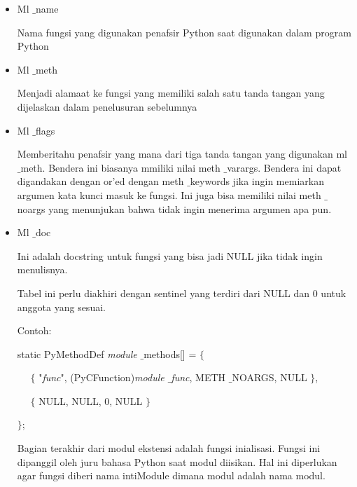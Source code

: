 \begin{itemize}
\item Ml $  \_  $name \par
Nama fungsi yang digunakan penafsir Python saat digunakan dalam program Python \par
\noindent 
\item Ml $  \_  $meth \par
Menjadi alamaat ke fungsi yang memiliki salah satu tanda tangan yang dijelaskan dalam penelusuran sebelumnya \par
\noindent 
\item Ml $  \_  $flags \par
Memberitahu penafsir yang mana dari tiga tanda tangan yang digunakan ml $  \_  $meth. Bendera ini biasanya mmiliki nilai meth $  \_  $varargs. Bendera ini dapat digandakan dengan or’ed dengan meth $  \_  $keywords jika ingin memiarkan argumen kata kunci masuk ke fungsi. Ini juga bisa memiliki nilai meth $  \_  $noargs yang menunjukan bahwa tidak ingin menerima argumen apa pun. \par
\noindent 
\item Ml $  \_  $doc \par
Ini adalah docstring untuk fungsi yang bisa jadi NULL jika tidak ingin menulisnya. \par
\vspace{12pt}
\vspace{12pt}
\noindent 
 \hspace*{0.5in} Tabel ini perlu diakhiri dengan sentinel yang terdiri dari NULL dan 0 untuk anggota yang sesuai. \par
\vspace{12pt}
\noindent 
Contoh: \par
\noindent 
static PyMethodDef \textit{module} $  \_  $methods[] =  $  \{  $ \par
\noindent 
~~  $  \{  $ "\textit{func}", (PyCFunction)\textit{module $  \_  $func}, METH $  \_  $NOARGS, NULL  $  \}  $, \par
\noindent 
~~  $  \{  $ NULL, NULL, 0, NULL  $  \}  $ \par
\noindent 
 $  \}  $; \par
\vspace{12pt}
\noindent 
 \hspace*{0.5in} Bagian terakhir dari modul ekstensi adalah fungsi inialisasi. Fungsi ini dipanggil oleh juru bahasa Python saat modul diisikan. Hal ini diperlukan agar fungsi diberi nama intiModule dimana modul adalah nama modul. \par

\end{itemize}
